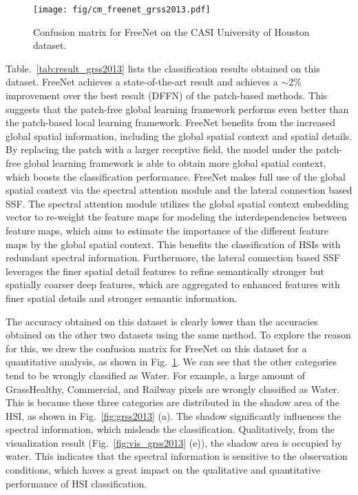 \documentclass[journal]{IEEEtran}
\begin{document}
\begin{figure}[hbt]
  \centering
  \texttt{[image: fig/cm\_freenet\_grss2013.pdf]}
  \caption{Confusion matrix for FreeNet on the CASI University of Houston dataset.}
  \label{fig:cm_freenet_grss2013}
\end{figure}





Table.~\ref{tab:result_grss2013} lists the classification results obtained on this dataset.
FreeNet achieves a state-of-the-art result and achieves a $\sim$2\% improvement over the best result (DFFN) of the patch-based methods.
This suggests that the patch-free global learning framework performs even better than the patch-based local learning framework.
FreeNet benefits from the increased global spatial information, including the global spatial context and spatial details.
By replacing the patch with a larger receptive field, the model under the patch-free global learning framework is able to obtain more global spatial context, which boosts the classification performance.
FreeNet makes full use of the global spatial context via the spectral attention module and the lateral connection based SSF.
The spectral attention module utilizes the global spatial context embedding vector to re-weight the feature maps for modeling the interdependencies between feature maps, which aims to estimate the importance of the different feature maps by the global spatial context.
This benefits the classification of HSIs with redundant spectral information.
Furthermore, the lateral connection based SSF leverages the finer spatial detail features to refine semantically stronger but spatially coarser deep features, which are aggregated to enhanced features with finer spatial details and stronger semantic information.


The accuracy obtained on this dataset is clearly lower than the accuracies obtained on the other two datasets using the same method.
To explore the reason for this, we drew the confusion matrix for FreeNet on this dataset for  a quantitative analysis, as shown in Fig.~\ref{fig:cm_freenet_grss2013}.
We can see that the other categories tend to be wrongly classified as Water.
For example, a large amount of GrassHealthy, Commercial, and Railway pixels are wrongly classified as Water. 
This is because these three categories are distributed in the shadow area of the HSI, as shown in Fig.~\ref{fig:grss2013} (a).
The shadow significantly influences the spectral information, which misleads the classification.
Qualitatively, from the visualization result (Fig.~\ref{fig:vis_grss2013} (e)), the shadow area is occupied by water.
This indicates that the spectral information is sensitive to the observation conditions, which haves a great impact on the qualitative and quantitative performance of HSI classification.
\end{document}
